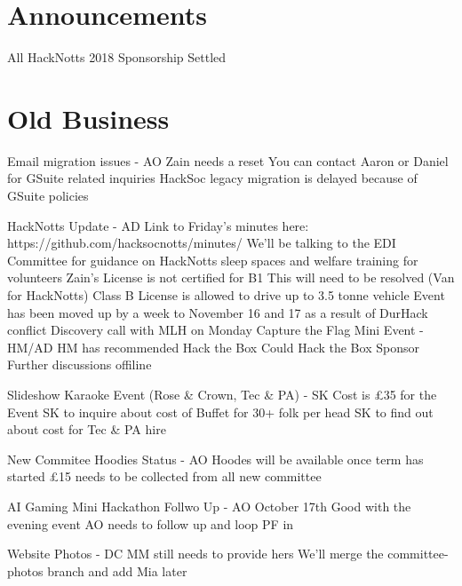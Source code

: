 \documentclass[11pt,hacksoc]{meetingmins}
\begin{document}
\maketitle

\section{Announcements}
\begin{items}
  \item All HackNotts 2018 Sponsorship Settled
\end{items}

\section{Old Business}
\begin{items}
  \item Email migration issues - AO
    \subitem Zain needs a reset
    \subitem You can contact Aaron or Daniel for GSuite related inquiries
    \subitem HackSoc legacy migration is delayed because of GSuite policies
  \item HackNotts Update - AD
    \subitem Link to Friday's minutes here: https://github.com/hacksocnotts/minutes/
    \subitem We'll be talking to the EDI Committee for guidance on HackNotts sleep spaces and welfare training for volunteers
    \subitem Zain's License is not certified for B1
      \subsubitem This will need to be resolved (Van for HackNotts)
      \subsubitem Class B License is allowed to drive up to 3.5 tonne vehicle
    \subitem Event has been moved up by a week to November 16 and 17 as a result of DurHack conflict
    \subitem Discovery call with MLH on Monday
    \subitem Capture the Flag Mini Event - HM/AD
      \subsubitem HM has recommended Hack the Box
      \subsubitem Could Hack the Box Sponsor
      \subsubitem Further discussions offiline
  \item Slideshow Karaoke Event (Rose \& Crown, Tec \& PA) - SK
    \subitem Cost is \pounds 35 for the Event
    \subitem SK to inquire about cost of Buffet for 30+ folk per head
    \subitem SK to find out about cost for Tec \& PA hire
  \item New Commitee Hoodies Status - AO
    \subitem Hoodes will be available once term has started
    \subitem \pounds15 needs to be collected from all new committee
  \item AI Gaming Mini Hackathon Follwo Up - AO
    \subitem October 17th
    \subitem Good with the evening event
    \subitem AO needs to follow up and loop PF in
  \item Website Photos - DC
    \subitem MM still needs to provide hers
    \subitem We'll merge the committee-photos branch and add Mia later
\end{items}
\end{document}
